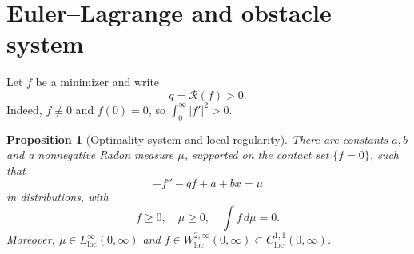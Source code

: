 \documentclass[11pt]{amsart}
\newtheorem{proposition}[theorem]{Proposition}
\theoremstyle{definition}
\theoremstyle{remark}
\newcommand{\Rcal}{\mathcal R}
\begin{document}
\section{Euler--Lagrange and obstacle system}
Let $f$ be a minimizer and write
\[
 q=\Rcal(f)>0.
\]
Indeed, $f\not\equiv0$ and $f(0)=0$, so $\int_0^\infty |f'|^2>0$.

\begin{proposition}[Optimality system and local regularity]\label{prop:obstacle}
There are constants $a,b$ and a nonnegative Radon measure $\mu$, supported on the contact set $\{f=0\}$, such that
\begin{equation}\label{eq:kkt}
 -f''-qf+a+bx=\mu
\end{equation}
in distributions, with
\[
 f\geq0,
 \quad \mu\geq0,
 \quad \int f\,d\mu=0.
\]
Moreover, $\mu\in L^\infty_{\mathrm{loc}}(0,\infty)$ and
$f\in W^{2,\infty}_{\mathrm{loc}}(0,\infty)\subset C^{1,1}_{\mathrm{loc}}(0,\infty)$.
\end{proposition}
\end{document}
